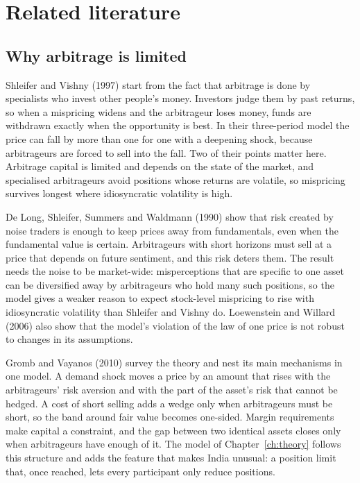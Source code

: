 \chapter{Related literature}\label{ch:lit}

\section{Why arbitrage is limited}
Shleifer and Vishny (1997) start from the fact that arbitrage is done by specialists who invest other people's money.
Investors judge them by past returns, so when a mispricing widens and the arbitrageur loses money, funds are withdrawn
exactly when the opportunity is best. In their three-period model the price can fall by more than one for one with a
deepening shock, because arbitrageurs are forced to sell into the fall. Two of their points matter here. Arbitrage
capital is limited and depends on the state of the market, and specialised arbitrageurs avoid positions whose returns are
volatile, so mispricing survives longest where idiosyncratic volatility is high.

De Long, Shleifer, Summers and Waldmann (1990) show that risk created by noise traders is enough to keep prices away from
fundamentals, even when the fundamental value is certain. Arbitrageurs with short horizons must sell at a price that
depends on future sentiment, and this risk deters them. The result needs the noise to be market-wide: misperceptions
that are specific to one asset can be diversified away by arbitrageurs who hold many such positions, so the model gives a
weaker reason to expect stock-level mispricing to rise with idiosyncratic volatility than Shleifer and Vishny do.
Loewenstein and Willard (2006) also show that the model's violation of the law of one price is not robust to changes in
its assumptions.

Gromb and Vayanos (2010) survey the theory and nest its main mechanisms in one model. A demand shock moves a price by an
amount that rises with the arbitrageurs' risk aversion and with the part of the asset's risk that cannot be hedged. A
cost of short selling adds a wedge only when arbitrageurs must be short, so the band around fair value becomes one-sided.
Margin requirements make capital a constraint, and the gap between two identical assets closes only when arbitrageurs
have enough of it. The model of Chapter~\ref{ch:theory} follows this structure and adds the feature that makes India
unusual: a position limit that, once reached, lets every participant only reduce positions.

